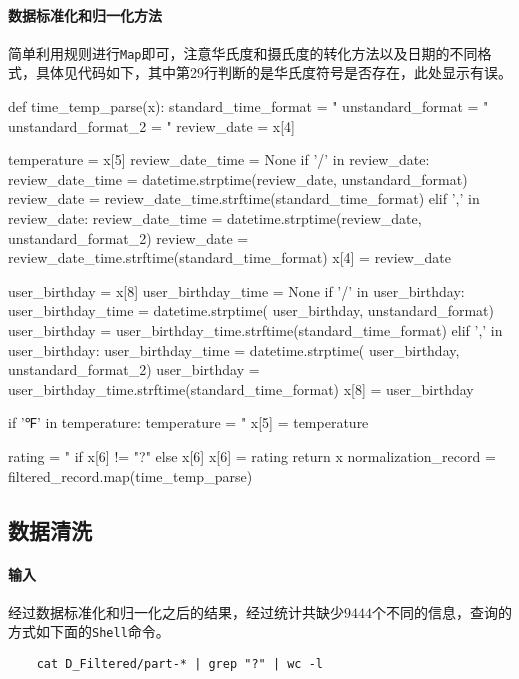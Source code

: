 \documentclass{ML}
\begin{document}
\paragraph{数据标准化和归一化方法} 简单利用规则进行\texttt{Map}即可，注意华氏度和摄氏度的转化方法以及日期的不同格式，具体见代码如下，其中第29行判断的是华氏度符号是否存在，此处显示有误。
\begin{pythoncode}
def time_temp_parse(x):
    standard_time_format = "%
    unstandard_format = "%
    unstandard_format_2 = "%
    review_date = x[4]

    temperature = x[5]
    review_date_time = None
    if '/' in review_date:
        review_date_time = datetime.strptime(review_date, unstandard_format)
        review_date = review_date_time.strftime(standard_time_format)
    elif ',' in review_date:
        review_date_time = datetime.strptime(review_date, unstandard_format_2)
        review_date = review_date_time.strftime(standard_time_format)
    x[4] = review_date

    user_birthday = x[8]
    user_birthday_time = None
    if '/' in user_birthday:
        user_birthday_time = datetime.strptime(
            user_birthday, unstandard_format)
        user_birthday = user_birthday_time.strftime(standard_time_format)
    elif ',' in user_birthday:
        user_birthday_time = datetime.strptime(
            user_birthday, unstandard_format_2)
        user_birthday = user_birthday_time.strftime(standard_time_format)
    x[8] = user_birthday

    if '℉' in temperature:
        temperature = "%
        x[5] = temperature

    rating = "%
                         if x[6] != "?" else x[6]
    x[6] = rating
    return x
normalization_record = filtered_record.map(time_temp_parse)
\end{pythoncode}
\subsection{数据清洗}
\paragraph{输入} 经过数据标准化和归一化之后的结果，经过统计共缺少$9444$个不同的信息，查询的方式如下面的\texttt{Shell}命令。
\begin{verbatim}
    cat D_Filtered/part-* | grep "?" | wc -l 
\end{verbatim}
\end{document}

